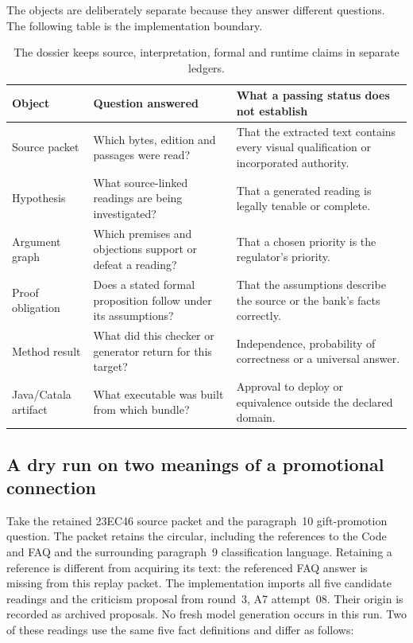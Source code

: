 \documentclass[12pt,a4paper,oneside,openany]{book}
\begin{document}
The objects are deliberately separate because they answer different questions.
The following table is the implementation boundary.

\begin{table}[H]
\centering\small
\begin{tabularx}{\textwidth}{P{0.19\textwidth}Y Y}
\toprule
Object & Question answered & What a passing status does not establish \\
\midrule
Source packet & Which bytes, edition and passages were read? & That the extracted text contains every visual qualification or incorporated authority. \\
Hypothesis & What source-linked readings are being investigated? & That a generated reading is legally tenable or complete. \\
Argument graph & Which premises and objections support or defeat a reading? & That a chosen priority is the regulator's priority. \\
Proof obligation & Does a stated formal proposition follow under its assumptions? & That the assumptions describe the source or the bank's facts correctly. \\
Method result & What did this checker or generator return for this target? & Independence, probability of correctness or a universal answer. \\
Java/Catala artifact & What executable was built from which bundle? & Approval to deploy or equivalence outside the declared domain. \\
\bottomrule
\end{tabularx}
\caption{The dossier keeps source, interpretation, formal and runtime claims in separate ledgers.}
\label{tab:proof-carrying-boundaries}
\end{table}

\subsection{A dry run on two meanings of a promotional connection}

Take the retained 23EC46 source packet and the paragraph~10 gift-promotion
question. The packet retains the circular, including the references to the Code
and FAQ and the surrounding paragraph~9 classification language. Retaining a
reference is different from acquiring its text: the referenced FAQ answer is
missing from this replay packet. The implementation imports all five candidate
readings and the criticism proposal from round~3, A7 attempt~08. Their origin is
recorded as archived proposals. No fresh model generation occurs in this run.
Two of these readings use the same five fact definitions and differ as follows:
\end{document}
